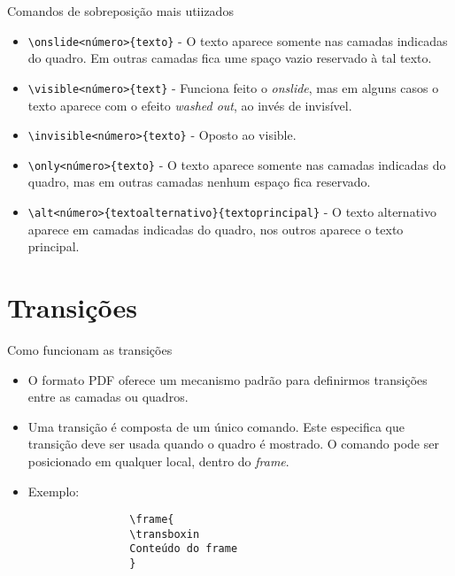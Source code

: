 \documentclass{beamer}
\begin{document}
\begin{frame}[fragile]

    \begin{block}{Comandos de sobreposição mais utiizados}
    \begin{itemize}
        \item <1-> \verb|\onslide<número>{texto}| - O texto aparece somente nas camadas indicadas do quadro. Em outras camadas fica ume spaço vazio reservado à tal texto. 
        
        \item <2-> \verb|\visible<número>{text}| - Funciona feito o \textit{onslide}, mas em alguns casos o texto aparece com o efeito \textit{washed out}, ao invés de invisível. 
        
        \item <3-> \verb|\invisible<número>{texto}| - Oposto ao visible. 
        
        \item  <4-> \verb|\only<número>{texto}| - O texto aparece somente nas camadas indicadas do quadro, mas em outras camadas nenhum espaço fica reservado.
        
        \item <5-> \verb|\alt<número>{textoalternativo}{textoprincipal}| - O texto alternativo aparece em camadas indicadas do quadro, nos outros aparece o texto principal.
    \end{itemize}  
    \end{block}
    
\end{frame}

\section{Transi\c c\~oes}

\begin{frame}[fragile]
    \begin{block}{Como funcionam as transi\c c\~oes}
        \begin{itemize}
            \item <1-> O formato PDF oferece um mecanismo padrão para definirmos transições entre as camadas ou quadros. 
            
            \item <2-> Uma transição é composta de um único comando. Este especifica que transição deve ser usada quando o quadro é mostrado. O comando pode ser posicionado em qualquer local, dentro do \textit{frame}.

            \item <3-> Exemplo:
            \begin{verbatim}
                \frame{ 
                \transboxin 
                Conteúdo do frame 
                }
            \end{verbatim}
        \end{itemize}
    \end{block}
\end{frame}
\end{document}
